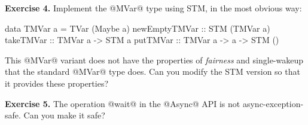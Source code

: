 \documentclass[11pt,a4paper]{article}
\begin{document}
\textbf{Exercise 4.} Implement the @MVar@ type using STM, in the most
obvious way:

\begin{haskell}
data TMVar a = TVar (Maybe a)
newEmptyTMVar :: STM (TMVar a)
takeTMVar     :: TMVar a -> STM a
putTMVar      :: TMVar a -> a -> STM ()
\end{haskell}

This @MVar@ variant does not have the properties of \emph{fairness}
and {single-wakeup} that the standard @MVar@ type does.  Can you
modify the STM version so that it provides these properties?

\textbf{Exercise 5.} The operation @wait@ in the @Async@ API is not
async-exception-safe.  Can you make it safe?

\end{document}
